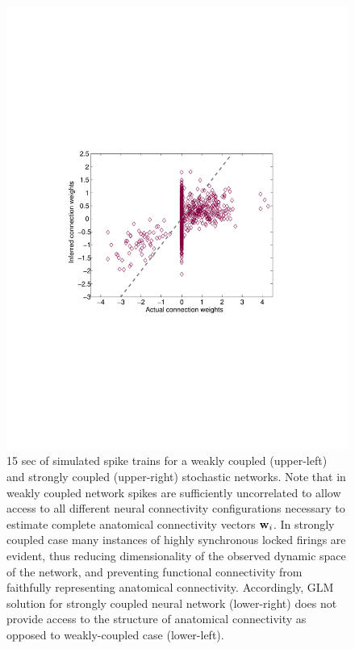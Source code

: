 \begin{figure}
\begin{minipage}[c]{0.45\hsize}
\includegraphics[width=\hsize]{../figs/Figure8a_fluor_strong_glm}
\end{minipage}
\caption{15 sec of simulated spike trains for a weakly coupled (upper-left)
and strongly coupled (upper-right) stochastic networks. Note that in weakly coupled network spikes are sufficiently uncorrelated to allow access to all different neural connectivity configurations necessary to estimate complete anatomical connectivity vectors ${\bf w}_i$. In strongly coupled case many instances of highly synchronous locked firings are evident, thus reducing dimensionality of the observed dynamic space of the network, and preventing functional connectivity from faithfully representing anatomical connectivity.
Accordingly, GLM solution for strongly coupled neural network (lower-right) does not provide access to the structure of anatomical connectivity as opposed to weakly-coupled case (lower-left).}
\label{fig:rasters}
\end{figure}

